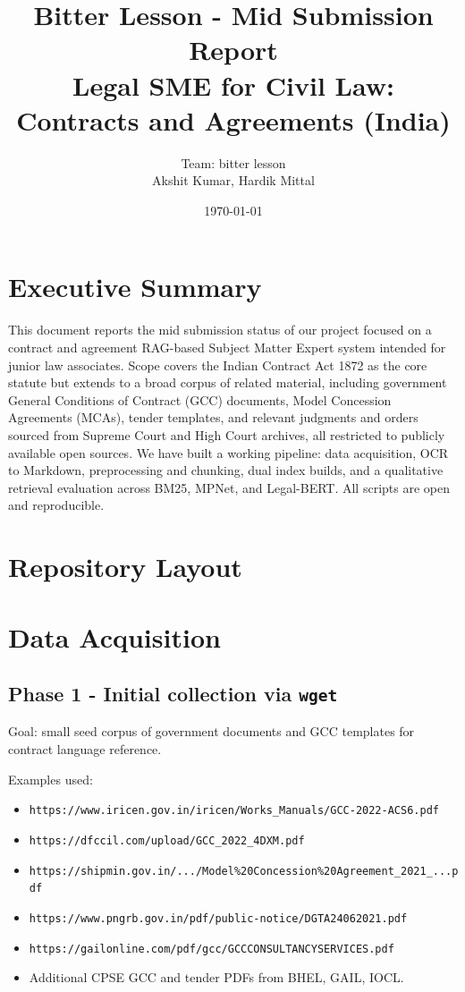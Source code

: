 \documentclass[11pt]{article}
\title{Bitter Lesson - Mid Submission Report\\Legal SME for Civil Law: Contracts and Agreements (India)}
\author{Team: bitter lesson\\\small{Akshit Kumar, Hardik Mittal}}
\date{\today}
\begin{document}
\maketitle

\section*{Executive Summary}
This document reports the mid submission status of our project focused on a contract and agreement RAG-based Subject Matter Expert system intended for junior law associates. Scope covers the Indian Contract Act 1872 as the core statute but extends to a broad corpus of related material, including government General Conditions of Contract (GCC) documents, Model Concession Agreements (MCAs), tender templates, and relevant judgments and orders sourced from Supreme Court and High Court archives, all restricted to publicly available open sources.
We have built a working pipeline: data acquisition, OCR to Markdown, preprocessing and chunking, dual index builds, and a qualitative retrieval evaluation across BM25, MPNet, and Legal-BERT. All scripts are open and reproducible.


\section{Repository Layout}

\section{Data Acquisition}

\subsection{Phase 1 - Initial collection via \texttt{wget}}
Goal: small seed corpus of government documents and GCC templates for contract language reference.

\noindent Examples used:
\begin{itemize}[leftmargin=1.2em]
  \item \texttt{https://www.iricen.gov.in/iricen/Works\_Manuals/GCC-2022-ACS6.pdf}
  \item \texttt{https://dfccil.com/upload/GCC\_2022\_4DXM.pdf}
  \item \texttt{https://shipmin.gov.in/.../Model\%20Concession\%20Agreement\_2021\_...pdf}
  \item \texttt{https://www.pngrb.gov.in/pdf/public-notice/DGTA24062021.pdf}
  \item \texttt{https://gailonline.com/pdf/gcc/GCCCONSULTANCYSERVICES.pdf}
  \item Additional CPSE GCC and tender PDFs from BHEL, GAIL, IOCL.
\end{itemize}
\end{document}
